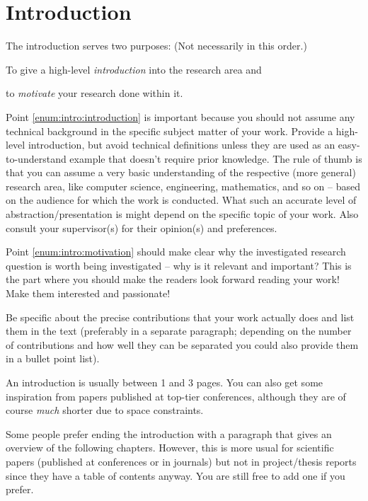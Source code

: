 \chapter{Introduction}

The introduction serves two purposes: \hfill (Not necessarily in this order.)
\begin{compactenum}
  \item To give a high-level \emph{introduction} into the research area and\label{enum:intro:introduction}
  \item to \emph{motivate} your research done within it.\label{enum:intro:motivation}
\end{compactenum}

Point \ref{enum:intro:introduction} is important because you should not assume any technical background in the specific subject matter of your work. Provide a high-level introduction, but avoid technical definitions unless they are used as an easy-to-understand example that doesn't require prior knowledge. The rule of thumb is that you can assume a very basic understanding of the respective (more general) research area, like computer science, engineering, mathematics, and so on -- based on the audience for which the work is conducted. What such an accurate level of abstraction/presentation is might depend on the specific topic of your work. Also consult your supervisor(s) for their opinion(s) and preferences. 

Point \ref{enum:intro:motivation} should make clear why the investigated research question is worth being investigated -- why is it relevant and important? This is the part where you should make the readers look forward reading your work! Make them interested and passionate!

Be specific about the precise contributions that your work actually does and list them in the text (preferably in a separate paragraph; depending on the number of contributions and how well they can be separated you could also provide them in a bullet point list).

An introduction is usually between 1 and 3 pages. You can also get some inspiration from papers published at top-tier conferences, although they are of course \emph{much} shorter due to space constraints.

Some people prefer ending the introduction with a paragraph that gives an overview of the following chapters. However, this is more usual for scientific papers (published at conferences or in journals) but not in project/thesis reports since they have a table of contents anyway. You are still free to add one if you prefer.
